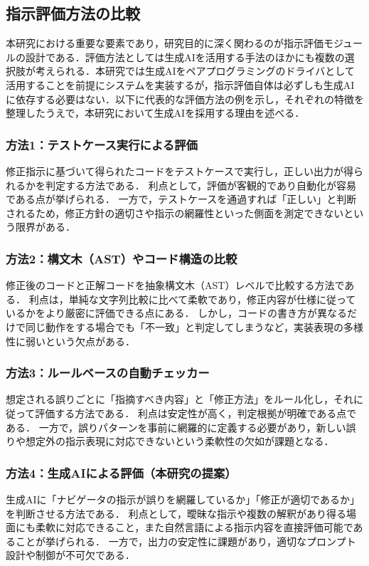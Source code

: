 \documentclass[twoside,twocolumn,10pt]{jsarticle}
\begin{document}
\subsection{指示評価方法の比較}
本研究における重要な要素であり，研究目的に深く関わるのが指示評価モジュールの設計である．評価方法としては生成AIを活用する手法のほかにも複数の選択肢が考えられる．本研究では生成AIをペアプログラミングのドライバとして活用することを前提にシステムを実装するが，指示評価自体は必ずしも生成AIに依存する必要はない．以下に代表的な評価方法の例を示し，それぞれの特徴を整理したうえで，本研究において生成AIを採用する理由を述べる．

\subsubsection*{方法1：テストケース実行による評価}
修正指示に基づいて得られたコードをテストケースで実行し，正しい出力が得られるかを判定する方法である．  
利点として，評価が客観的であり自動化が容易である点が挙げられる．  
一方で，テストケースを通過すれば「正しい」と判断されるため，修正方針の適切さや指示の網羅性といった側面を測定できないという限界がある．

\subsubsection*{方法2：構文木（AST）やコード構造の比較}
修正後のコードと正解コードを抽象構文木（AST）レベルで比較する方法である．  
利点は，単純な文字列比較に比べて柔軟であり，修正内容が仕様に従っているかをより厳密に評価できる点にある．  
しかし，コードの書き方が異なるだけで同じ動作をする場合でも「不一致」と判定してしまうなど，実装表現の多様性に弱いという欠点がある．

\subsubsection*{方法3：ルールベースの自動チェッカー}
想定される誤りごとに「指摘すべき内容」と「修正方法」をルール化し，それに従って評価する方法である．  
利点は安定性が高く，判定根拠が明確である点である．  
一方で，誤りパターンを事前に網羅的に定義する必要があり，新しい誤りや想定外の指示表現に対応できないという柔軟性の欠如が課題となる．

\subsubsection*{方法4：生成AIによる評価（本研究の提案）}
生成AIに「ナビゲータの指示が誤りを網羅しているか」「修正が適切であるか」を判断させる方法である．  
利点として，曖昧な指示や複数の解釈があり得る場面にも柔軟に対応できること，また自然言語による指示内容を直接評価可能であることが挙げられる．  
一方で，出力の安定性に課題があり，適切なプロンプト設計や制御が不可欠である．
\end{document}
